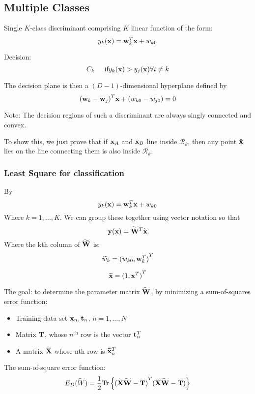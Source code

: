\subsection{Multiple Classes}
Single $K$-class discriminant comprising $K$ linear function of the form:
\begin{equation}
    y_k(\mathbf{x}) = \mathbf{w}^T_k\mathbf{x} + w_{k0}
\end{equation}

Decision:
\begin{equation}
    C_k \hspace{0.5cm} \text{if}\vspace{0.2cm} y_k(\bx) > y_j(\bx) \forall i \neq k
\end{equation}

The decision plane is then a $(D-1)$-dimensional hyperplane defined by
\begin{equation}
    {(\mathbf{w}_k - \mathbf{w}_j)}^T\mathbf{x} + (w_{k0} - w_{j0}) = 0
\end{equation}

Note: The decision regions of such a discriminant are always singly
connected and convex.

To show this, we just prove that if $\mathbf{x}_A$ and $\mathbf{x}_B$ line inside
$\mathcal{R}_k$, then any point $\hat{\mathbf{x}}$ lies on the line connecting
them is also inside $\mathcal{R}_k$.

\subsubsection{Least Square for classification}
By 
\begin{equation}
    y_k(\mathbf{x}) = \mathbf{w}_k^T \mathbf{x} + w_{k0}
\end{equation}
Where $k = 1, \dots, K$. We can group these together using vector notation
so that
\begin{equation}
    \mathbf{y}(\mathbf{x}) = \widetilde{\mathbf{W}}^T\widetilde{\mathbf{x}}
\end{equation}
Where the kth column of $\widetilde{\mathbf{W}}$ is:
\begin{equation}
    \widetilde{w}_k = {(w_{k0}, \mathbf{w}_k^T)}^T
\end{equation}

\begin{equation}
    \widetilde{\mathbf{x}} = {(1, \mathbf{x}^T)}^T
\end{equation}

The goal: to determine the parameter matrix $\widetilde{\mathbf{W}}$, by
minimizing a sum-of-squares error function:
\begin{itemize}
    \item Training data set ${\mathbf{x}_n, \mathbf{t}_n}$, $n = 1, \dots, N$
    \item Matrix $\mathbf{T}$, whose $n^{\text{th}}$ row is the vector $\mathbf{t}^T_n$
    \item A matrix $\widetilde{\mathbf{X}}$ whose nth row is
        $\widetilde{\mathbf{x}}^T_n$
\end{itemize}
The sum-of-square error function:
\begin{equation}
    E_D(\widetilde{W}) = \frac{1}{2}\text{Tr}\left\{ {(\widetilde{\mathbf{X}}\widetilde{\mathbf{W}} -
    \mathbf{T})}^T(\widetilde{\mathbf{X}}\widetilde{\mathbf{W}} - \mathbf{T}) \right\}
\end{equation}

